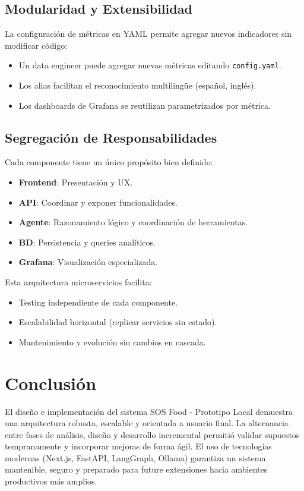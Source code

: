 \documentclass[11pt, a4paper]{report}
\begin{document}
\subsection{Modularidad y Extensibilidad}

La configuración de métricas en YAML permite agregar nuevos indicadores sin modificar código:

\begin{itemize}
    \item Un data engineer puede agregar nuevas métricas editando \texttt{config.yaml}.
    \item Los alias facilitan el reconocimiento multilingüe (español, inglés).
    \item Los dashboards de Grafana se reutilizan parametrizados por métrica.
\end{itemize}

\subsection{Segregación de Responsabilidades}

Cada componente tiene un único propósito bien definido:

\begin{itemize}
    \item \textbf{Frontend}: Presentación y UX.
    \item \textbf{API}: Coordinar y exponer funcionalidades.
    \item \textbf{Agente}: Razonamiento lógico y coordinación de herramientas.
    \item \textbf{BD}: Persistencia y queries analíticos.
    \item \textbf{Grafana}: Visualización especializada.
\end{itemize}

Esta arquitectura microservicios facilita:
\begin{itemize}
    \item Testing independiente de cada componente.
    \item Escalabilidad horizontal (replicar servicios sin estado).
    \item Mantenimiento y evolución sin cambios en cascada.
\end{itemize}

\section{Conclusión}

El diseño e implementación del sistema SOS Food - Prototipo Local demuestra una arquitectura robusta, escalable y orientada a usuario final. La alternancia entre fases de análisis, diseño y desarrollo incremental permitió validar supuestos tempranamente y incorporar mejoras de forma ágil. El uso de tecnologías modernas (Next.js, FastAPI, LangGraph, Ollama) garantiza un sistema mantenible, seguro y preparado para future extensiones hacia ambientes productivos más amplios.
\end{document}
